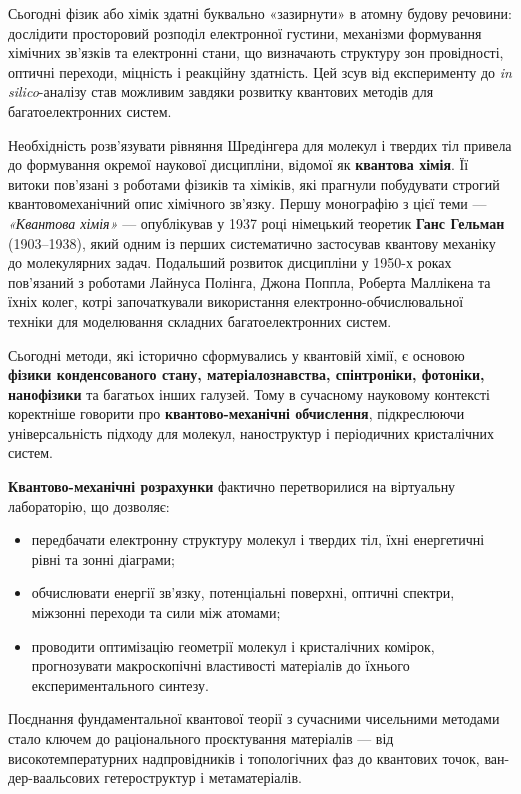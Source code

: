 Сьогодні фізик або хімік здатні буквально «зазирнути» в атомну будову речовини: дослідити просторовий розподіл електронної густини, механізми формування хімічних зв’язків та електронні стани, що визначають структуру зон провідності, оптичні переходи, міцність і реакційну здатність. Цей зсув від експерименту до \emph{in silico}-аналізу став можливим завдяки розвитку квантових методів для багатоелектронних систем.

Необхідність розв’язувати рівняння Шредінгера для молекул і твердих тіл привела до формування окремої наукової дисципліни, відомої як \textbf{квантова хімія}. Її витоки пов’язані з роботами фізиків та хіміків, які прагнули побудувати строгий квантовомеханічний опис хімічного зв’язку. Першу монографію з цієї теми --- \emph{«Квантова хімія»} --- опублікував у 1937 році німецький теоретик \textbf{Ганс Гельман} (1903–1938), який одним із перших систематично застосував квантову механіку до молекулярних задач. Подальший розвиток дисципліни у 1950-х роках пов’язаний з роботами Лайнуса Полінга, Джона Поппла, Роберта Маллікена та їхніх колег, котрі започаткували використання електронно-обчислювальної техніки для моделювання складних багатоелектронних систем.

Сьогодні методи, які історично сформувались у квантовій хімії, є основою \textbf{фізики конденсованого стану, матеріалознавства, спінтроніки, фотоніки, нанофізики} та багатьох інших галузей. Тому в сучасному науковому контексті коректніше говорити про \textbf{квантово-механічні обчислення}, підкреслюючи універсальність підходу для молекул, наноструктур і періодичних кристалічних систем.

\textbf{Квантово-механічні розрахунки} фактично перетворилися на віртуальну лабораторію, що дозволяє:
\begin{itemize}
    \item передбачати електронну структуру молекул і твердих тіл, їхні енергетичні рівні та зонні діаграми;
    \item обчислювати енергії зв’язку, потенціальні поверхні, оптичні спектри, міжзонні переходи та сили між атомами;
    \item проводити оптимізацію геометрії молекул і кристалічних комірок, прогнозувати макроскопічні властивості матеріалів до їхнього експериментального синтезу.
\end{itemize}

Поєднання фундаментальної квантової теорії з сучасними чисельними методами стало ключем до раціонального проєктування матеріалів --- від високотемпературних надпровідників і топологічних фаз до квантових точок, ван-дер-ваальсових гетероструктур і метаматеріалів.

